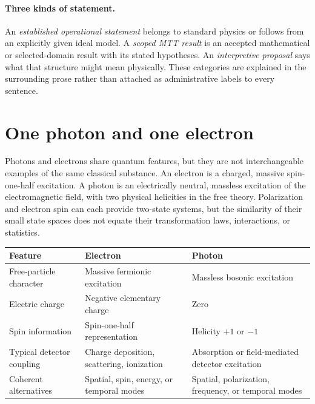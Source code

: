 \documentclass[11pt,a4paper]{article}
\begin{document}
\paragraph{Three kinds of statement.}
An \emph{established operational statement} belongs to standard physics or follows from an explicitly given ideal model. A \emph{scoped MTT result} is an accepted mathematical or selected-domain result with its stated hypotheses. An \emph{interpretive proposal} says what that structure might mean physically. These categories are explained in the surrounding prose rather than attached as administrative labels to every sentence.

\section{One photon and one electron}
\label{sec:species}
Photons and electrons share quantum features, but they are not interchangeable examples of the same classical substance. An electron is a charged, massive spin-one-half excitation. A photon is an electrically neutral, massless excitation of the electromagnetic field, with two physical helicities in the free theory. Polarization and electron spin can each provide two-state systems, but the similarity of their small state spaces does not equate their transformation laws, interactions, or statistics.

\begin{center}
\begin{tabular}{@{}>{\raggedright\arraybackslash}p{}>{\raggedright\arraybackslash}p{}>{\raggedright\arraybackslash}p{}@{}}
\toprule
Feature & Electron & Photon\\
\midrule
Free-particle character & Massive fermionic excitation & Massless bosonic excitation\\
Electric charge & Negative elementary charge & Zero\\
Spin information & Spin-one-half representation & Helicity \(+1\) or \(-1\)\\
Typical detector coupling & Charge deposition, scattering, ionization & Absorption or field-mediated detector excitation\\
Coherent alternatives & Spatial, spin, energy, or temporal modes & Spatial, polarization, frequency, or temporal modes\\
\bottomrule
\end{tabular}
\end{center}
\end{document}

